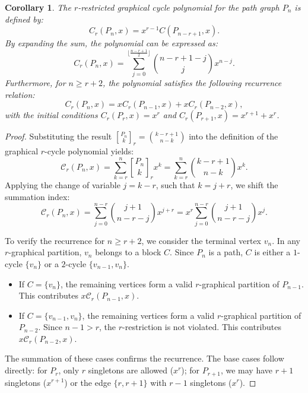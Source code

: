 \documentclass{amsart}
\newcounter{cases}
\newtheorem{corollary}[theorem]{Corollary}
\theoremstyle{definition}
\begin{document}
\begin{corollary}
The $r$-restricted graphical cycle polynomial for the path graph $P_n$ is defined by:
\begin{equation*}
    C_r(P_n, x) = x^{r-1} C(P_{n-r+1}, x).
\end{equation*}
By expanding the sum, the polynomial can be expressed as:
\begin{equation*}
    C_r(P_n, x) = \sum_{j=0}^{\lfloor \frac{n-r+1}{2} \rfloor} \binom{n-r+1-j}{j} x^{n-j}.
\end{equation*}
Furthermore, for $n \geq r+2$, the polynomial satisfies the following recurrence relation:
\begin{equation*}
    C_r(P_n, x) = x C_r(P_{n-1}, x) + x C_r(P_{n-2}, x),
\end{equation*}
with the initial conditions $C_r(P_r, x) = x^r$ and $C_r(P_{r+1}, x) = x^{r+1} + x^r$.
\end{corollary}



\begin{proof}
Substituting the result ${P_n \brack k}_r = \binom{k-r+1}{n-k}$ into the definition of the graphical $r$-cycle polynomial yields:
\begin{equation*}
    \mathcal{C}_r(P_n, x) = \sum_{k=r}^{n} {P_n \brack k}_r x^k = \sum_{k=r}^{n} \binom{k-r+1}{n-k} x^k.
\end{equation*}
Applying the change of variable $j = k-r$, such that $k = j+r$, we shift the summation index:
\begin{equation*}
    \mathcal{C}_r(P_n, x) = \sum_{j=0}^{n-r} \binom{j+1}{n-r-j} x^{j+r} = x^r \sum_{j=0}^{n-r} \binom{j+1}{n-r-j} x^j.
\end{equation*}

To verify the recurrence for $n \geq r+2$, we consider the terminal vertex $v_n$. In any $r$-graphical partition, $v_n$ belongs to a block $C$. Since $P_n$ is a path, $C$ is either a $1$-cycle $\{v_n\}$ or a $2$-cycle $\{v_{n-1}, v_n\}$.
\begin{itemize}
    \item If $C = \{v_n\}$, the remaining vertices form a valid $r$-graphical partition of $P_{n-1}$. This contributes $x \mathcal{C}_r(P_{n-1}, x)$.
    \item If $C = \{v_{n-1}, v_n\}$, the remaining vertices form a valid $r$-graphical partition of $P_{n-2}$. Since $n-1 > r$, the $r$-restriction is not violated. This contributes $x \mathcal{C}_r(P_{n-2}, x)$.
\end{itemize}
The summation of these cases confirms the recurrence. The base cases follow directly: for $P_r$, only $r$ singletons are allowed ($x^r$); for $P_{r+1}$, we may have $r+1$ singletons ($x^{r+1}$) or the edge $\{r, r+1\}$ with $r-1$ singletons ($x^r$).
\end{proof}
\end{document}
